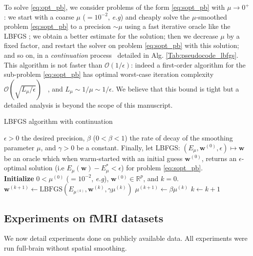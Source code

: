 To solve \eqref{eq:opt_pb}, we consider problems of the form
\eqref{eq:sopt_pb} with $\mu \rightarrow 0^+$: we start with a coarse
$\mu$ ($= 10^{-2}$, \emph{e.g}) and cheaply solve the $\mu$-smoothed problem
\eqref{eq:sopt_pb} to a precision $\sim \mu$ using a fast
iterative oracle like the LBFGS \citep{ciyou1994}; we
obtain a better estimate for the solution; then we decrease $\mu$ by a fixed factor,
and restart the solver on problem \eqref{eq:sopt_pb} with this solution; and so on, in a 
\emph{continuation} process~\citep{NESTA} detailed in Alg.
\ref{Tab:pseudocode_lbfgs}.
This algorithm is not faster than
$\mathcal{O}(1/\epsilon)$: indeed a first-order algorithm
for the sub-problem \eqref{eq:sopt_pb} has optimal worst-case iteration complexity $\mathcal{O}(\sqrt{L_{\mu}/\epsilon})$
~\citep{nesterov1983}, and $L_{\mu} \sim 1 / \mu \sim 1 / \epsilon$. We
believe that this bound is tight but a detailed analysis is
beyond the scope of this manuscript.
\begin{algorithm}
  \caption{LBFGS algorithm with continuation}
  \label{Tab:pseudocode_lbfgs}  
  \begin{algorithmic}[1]  
    \Require $\epsilon > 0$ the desired precision, $\beta$ ($0 < \beta <
    1$) the rate of decay of the smoothing parameter $\mu$, and $\gamma > 0$ be a constant.
    Finally,
    let LBFGS: $(E_\mu, \mathbf{w}^{(0)}, \epsilon) \mapsto \mathbf{w}$ be
    an oracle which when warm-started with an initial guess
    $\mathbf{w}^{(0)}$, returns an $\epsilon$-optimal
    solution (i.e $E_\mu(\mathbf{w}) - E_\mu^{*} < \epsilon$) for problem \eqref{eq:sopt_pb}.\\
    \textbf{Initialize} $ 0 < \mu^{(0)}$ ($= 10^{-2}$, \emph{e.g}),
    $\mathbf{w}^{(0)}\in \mathbb{R}^p$, and $k = 0$.
    \State $\mathbf{w}^{(k + 1)} \leftarrow \mbox{LBFGS}(E_{\mu^{(k)}}, \mathbf{w}^{(k)}, \gamma\mu^{(k)})$
    \State $\mu^{(k + 1)} \leftarrow \beta \mu^{(k)}$
    \State $k \leftarrow k + 1$
    \EndWhile
  \end{algorithmic}
\end{algorithm}

\subsection{Experiments on fMRI datasets}
\label{sec:experiments}
We now detail experiments done on publicly available
data. All experiments were run full-brain without spatial smoothing.

